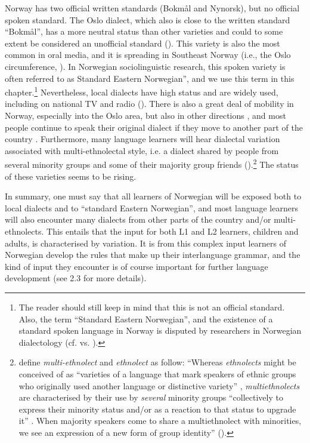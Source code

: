 \documentclass[output=paper,colorlinks,citecolor=brown,modfonts,nonflat]{../langscibook}
\begin{document}

Norway has two official written standards (Bokmål and Nynorsk), but no official spoken standard. The Oslo dialect, which also is close to the written standard ``Bokmål'', has a more neutral status than other varieties and could to some extent be considered an unofficial standard (\citealt{Mæhlum2009, Røyneland2009}). This variety is also the most common in oral media, and it is spreading in Southeast Norway (i.e., the Oslo circumference, \citealt{Mæhlum2009}). In Norwegian sociolinguistic research, this spoken variety is often referred to as Standard Eastern Norwegian'', and we use this term in this chapter.\footnote{{The reader should still keep in mind that this is not an official standard. Also, the term ``Standard Eastern Norwegian'', and the existence of a standard spoken language in Norway is disputed by researchers in Norwegian dialectology (cf. \citealt{Mæhlum2009} vs. \citealt{Sandøy2009}).} } Nevertheless, local dialects have high status and are widely used, including on national TV and radio (\citealt{Røyneland2009, Sandøy2011}). There is also a great deal of mobility in Norway, especially into the Oslo area, but also in other directions \citep{Stjernholm2013}, and most people continue to speak their original dialect if they move to another part of the country \citep[7]{Jahr1990}. Furthermore, many language learners will hear dialectal variation associated with multi-ethnolectal style, i.e. a dialect shared by people from several minority groups and some of their majority group friends (\citealt{SvendsenRøyneland2008, OpsahlNistov2010}).\footnote{{\citeauthor{SvendsenRøyneland2008} define} \textit{multi-ethnolect} and \textit{ethnolect} {as follow: “Whereas} {\textit{ethnolects}} {might be conceived of as “varieties of a language that mark speakers of ethnic groups who originally used another language or distinctive variety” \citep[86]{Clyne2000},} {\textit{multiethnolects}} {are characterised by their use by} {\textit{several}} {minority groups “collectively to express their minority status and/or as a reaction to that status to upgrade it” \citep[87]{Clyne2000}. When majority speakers come to share a multiethnolect with minorities, we see an expression of a new form of group identity” (\citealt[64]{SvendsenRøyneland2008}).}} The status of these varieties seems to be rising.

In summary, one must say that all learners of Norwegian will be exposed both to local dialects and to ``standard Eastern Norwegian'', and most language learners will also encounter many dialects from other parts of the country and/or multi-ethnolects. This entails that the input for both L1 and L2 learners, children and adults, is characterised by variation. It is from this complex input learners of Norwegian develop the rules that make up their interlanguage grammar, and the kind of input they encounter is of course important for further language development (see 2.3 for more details).
\end{document}
